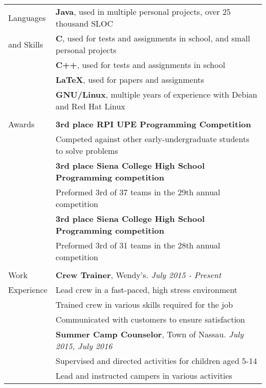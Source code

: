 \documentclass[letterpaper,10pt,oneside]{article}
\begin{document}
\begin{tabular}{@{} l l}
  \Large{Languages}
  & \textbf{Java}, used in  multiple personal projects, over 25 thousand SLOC \\
  \Large{and Skills}
  & \textbf{C}, used for tests and assignments in school, and small personal projects \\
  & \textbf{C++}, used for tests and assignments in school \\
  & \textbf{\LaTeX}, used for papers and assignments \\
  & \textbf{GNU/Linux}, multiple years of experience with Debian and Red Hat Linux \\
  & \\

  \Large{Awards}
  & \textbf{3rd place RPI UPE Programming Competition} \\
  & Competed against other early-undergraduate students to solve problems \\
  & \textbf{3rd place Siena College High School Programming competition} \\
  & Preformed 3rd of 37 teams in the 29th annual competition \\
  & \textbf{3rd place Siena College High School Programming competition} \\
  & Preformed 3rd of 31 teams in the 28th annual competition \\
  & \\

  \Large{Work}
  & \textbf{Crew Trainer}, Wendy's. \textit{July 2015 - Present} \\
  \Large{Experience}
  & Lead crew in a fast-paced, high stress environment \\
  & Trained crew in various skills required for the job \\
  & Communicated with customers to ensure satisfaction \\
  & \textbf{Summer Camp Counselor}, Town of Nassau. \textit{July 2015, July 2016} \\
  & Supervised and directed activities for children aged 5-14 \\
  & Lead and instructed campers in various activities \\


\end{tabular}
\end{document}

